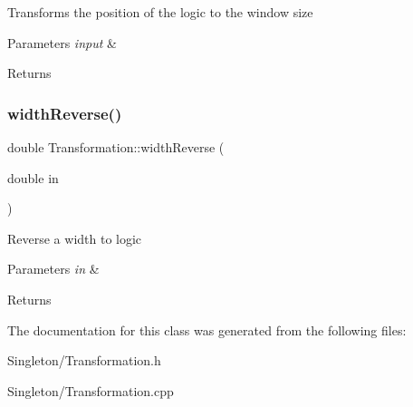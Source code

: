 Transforms the position of the logic to the window size 
\begin{DoxyParams}{Parameters}
{\em input} & \\
\hline
\end{DoxyParams}
\begin{DoxyReturn}{Returns}

\end{DoxyReturn}
\mbox{\label{classTransformation_a2b565d1de57cf114dc364b54f3b57fb3}} 
\subsubsection{\texorpdfstring{width\+Reverse()}{widthReverse()}}
{\footnotesize\ttfamily double Transformation\+::width\+Reverse (\begin{DoxyParamCaption}\item[{double}]{in }\end{DoxyParamCaption})}

Reverse a width to logic 
\begin{DoxyParams}{Parameters}
{\em in} & \\
\hline
\end{DoxyParams}
\begin{DoxyReturn}{Returns}

\end{DoxyReturn}


The documentation for this class was generated from the following files\+:\begin{DoxyCompactItemize}
\item 
Singleton/Transformation.\+h\item 
Singleton/Transformation.\+cpp\end{DoxyCompactItemize}
